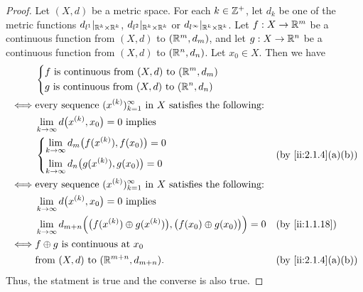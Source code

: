 \begin{proof}
  Let \((X, d)\) be a metric space.
  For each \(k \in \mathbb{Z}^+\), let \(d_k\) be one of the metric functions \(d_{l^1}|_{\mathbb{R}^k \times \mathbb{R}^k}\), \(d_{l^2}|_{\mathbb{R}^k \times \mathbb{R}^k}\) or \(d_{l^\infty}|_{\mathbb{R}^k \times \mathbb{R}^k}\).
  Let \(f : X \to \mathbb{R}^m\) be a continuous function from \((X, d)\) to \((\mathbb{R}^m, d_m)\), and let \(g : X \to \mathbb{R}^n\) be a continuous function from \((X, d)\) to \((\mathbb{R}^n, d_n)\).
  Let \(x_0 \in X\).
  Then we have
  \begin{align*}
         & \begin{dcases}
             f \text{ is continuous from } (X, d) \text{ to } (\R^m, d_m) \\
             g \text{ is continuous from } (X, d) \text{ to } (\R^n, d_n)
           \end{dcases}                                                                              \\
    \iff & \text{every sequence } (x^{(k)})_{k = 1}^\infty \text{ in } X \text{ satisfies the following:}                                            \\
         & \lim_{k \to \infty} d\big(x^{(k)}, x_0\big) = 0 \text{ implies }                                                                          \\
         & \begin{dcases}
             \lim_{k \to \infty} d_m\big(f(x^{(k)}), f(x_0)\big) = 0 \\
             \lim_{k \to \infty} d_n\big(g(x^{(k)}), g(x_0)\big) = 0
           \end{dcases}                                                        &  & \by{ii:2.1.4}[a,b]                                               \\
    \iff & \text{every sequence } (x^{(k)})_{k = 1}^\infty \text{ in } X \text{ satisfies the following:}                                            \\
         & \lim_{k \to \infty} d\big(x^{(k)}, x_0\big) = 0 \text{ implies }                                                                          \\
         & \lim_{k \to \infty} d_{m + n}\Big(\big(f(x^{(k)}) \oplus g(x^{(k)})\big), \big(f(x_0) \oplus g(x_0)\big)\Big) = 0 &  & \by{ii:1.1.18}     \\
    \iff & f \oplus g \text{ is continuous at } x_0                                                                                                  \\
         & \text{from } (X, d) \text{ to } (\R^{m + n}, d_{m + n}).                                                          &  & \by{ii:2.1.4}[a,b]
  \end{align*}
  Thus, the statment is true and the converse is also true.
\end{proof}

